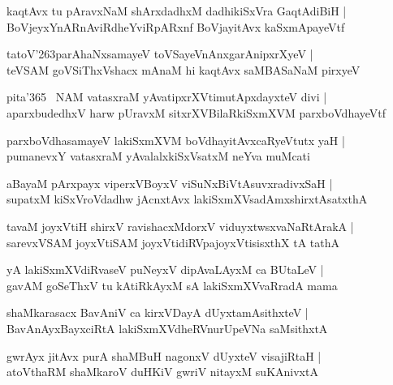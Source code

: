 \documentclass[twoside,12pt,openright]{book}
\def\S{\char'263}
\newcounter{shloka}[chapter]
\begin{document}
\begin{shloka}%
kaqtAvx tu pAravxNaM shArxdadhxM dadhikiSxVra GaqtAdiBiH |\\
BoVjeyxYnARnAviRdheYviRpARxnf BoVjayitAvx kaSxmApayeVtf 
\end{shloka}

\begin{shloka}%
tatoV\S parAhaNxsamayeV toVSayeVnAnxgarAnipxrXyeV |\\
teVSAM goVSiThxVshacx mAnaM hi kaqtAvx saMBASaNaM pirxyeV 
\end{shloka}

\begin{shloka}%
pita\char'365 ~NAM vatasxraM yAvatipxrXVtimutApxdayxteV divi |\\
aparxbudedhxV harw pUravxM sitxrXVBilaRkiSxmXVM parxboVdhayeVtf 
\end{shloka}

\begin{shloka}%
parxboVdhasamayeV lakiSxmXVM boVdhayitAvxcaRyeVtutx yaH |\\
pumanevxY vatasxraM yAvalalxkiSxVsatxM neYva muMcati 
\end{shloka}

\begin{shloka}%
aBayaM pArxpayx viperxVBoyxV viSuNxBiVtAsuvxradivxSaH |\\
supatxM kiSxVroVdadhw jAcnxtAvx lakiSxmXVsadAmxshirxtAsatxthA 
\end{shloka}

\begin{shloka}%
tavaM joyxVtiH shirxV ravishacxMdorxV viduyxtwsxvaNaRtArakA |\\
sarevxVSAM joyxVtiSAM joyxVtidiRVpajoyxVtisisxthX tA tathA 
\end{shloka}

\begin{shloka}%
yA lakiSxmXVdiRvaseV puNeyxV dipAvaLAyxM ca BUtaLeV |\\
gavAM goSeThxV tu kAtiRkAyxM sA lakiSxmXVvaRradA mama 
\end{shloka}

\begin{shloka}%
shaMkarasacx BavAniV ca kirxVDayA dUyxtamAsithxteV |\\
BavAnAyxBayxciRtA lakiSxmXVdheRVnurUpeVNa saMsithxtA 
\end{shloka}

\begin{shloka}%
gwrAyx jitAvx purA shaMBuH nagonxV dUyxteV visajiRtaH |\\
atoVthaRM shaMkaroV duHKiV gwriV nitayxM suKAnivxtA 
\end{shloka}
\end{document}
